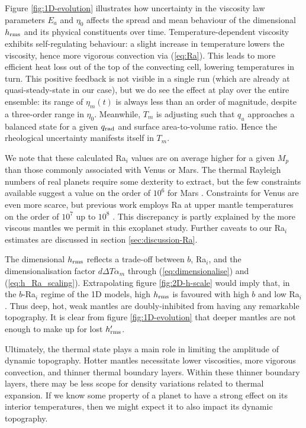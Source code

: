 \documentclass[trackchanges]{aastex63}
\begin{document}

Figure \ref{fig:1D-evolution} illustrates how uncertainty in the viscosity law parameters $E_a$ and $\eta_0$ affects the spread and mean behaviour of the dimensional $h_{\rm rms}$ and its physical constituents over time. Temperature-dependent viscosity exhibits self-regulating behaviour: a slight increase in temperature lowers the viscosity, hence more vigorous convection via (\ref{eq:Ra}). This leads to more efficient heat loss out of the top of the convecting cell, lowering temperatures in turn. This positive feedback is not visible in a single run (which are already at quasi-steady-state in our case), but we do see the effect at play over the entire ensemble: its range of $\eta_m(t)$ is always less than an order of magnitude, despite a three-order range in $\eta_0$. Meanwhile, $T_m$ is adjusting such that $q_u$ approaches a balanced state for a given $q_{\rm rad}$ and surface area-to-volume ratio. Hence the rheological uncertainty manifests itself in $T_m$. 

We note that these calculated Ra$_i$ values are on average higher for a given $M_p$ than those commonly associated with Venus or Mars. The thermal Rayleigh numbers of real planets require some dexterity to extract, but the few constraints available suggest a value on the order of $10^6$ for Mars \citep{kiefer_melting_2003, samuel_rheology_2019}. Constraints for Venus are even more scarce, but previous work employs Ra at upper mantle temperatures on the order of $10^7$ up to $10^8$ \citep{huang_constraints_2013, king_venus_2018}. This discrepancy is partly explained by the more viscous mantles we permit in this exoplanet study. Further caveats to our Ra$_i$ estimates are discussed in section \ref{sec:discussion-Ra}.

The dimensional $h_{\rm rms}$ reflects a trade-off between $b$, Ra$_i$, and the dimensionalisation factor $d \Delta T \alpha_m$ through (\ref{eq:dimensionalise}) and (\ref{eq:h_Ra_scaling}). Extrapolating figure \ref{fig:2D-h-scale} would imply that, in the $b$-Ra$_i$ regime of the 1D models, high $h_{\rm rms}$ is favoured with high $b$ and low Ra$_i$. Thus deep, hot, weak mantles are doubly-inhibited from having any remarkable topography. It is clear from figure \ref{fig:1D-evolution} that deeper mantles are not enough to make up for lost $h_{\rm rms}^\prime$. 

Ultimately, the thermal state plays a main role in limiting the amplitude of dynamic topography. Hotter mantles necessitate lower viscosities, more vigorous convection, and thinner thermal boundary layers. Within these thinner boundary layers, there may be less scope for density variations related to thermal expansion. If we know some property of a planet to have a strong effect on its interior temperatures, then we might expect it to also impact its dynamic topography.
\end{document}
